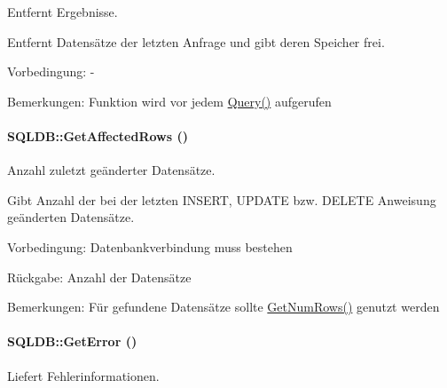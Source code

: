 Entfernt Ergebnisse. 

Entfernt Datensätze der letzten Anfrage und gibt deren Speicher frei. \begin{Desc}
\item[Vorbedingung:]- \end{Desc}
\begin{Desc}
\item[Bemerkungen:]Funktion wird vor jedem \hyperlink{classSQLDB_fc6ffa8df50f68f07d9f5e3385b96d7a}{Query()} aufgerufen \end{Desc}
\hypertarget{classSQLDB_8f3c28ae4ed5941c043459d6204a887b}{
\paragraph[GetAffectedRows]{\setlength{\rightskip}{0pt plus 5cm}SQLDB::Get\-Affected\-Rows ()}\hfill}
\label{classSQLDB_8f3c28ae4ed5941c043459d6204a887b}


Anzahl zuletzt geänderter Datensätze. 

Gibt Anzahl der bei der letzten INSERT, UPDATE bzw. DELETE Anweisung geänderten Datensätze. \begin{Desc}
\item[Vorbedingung:]Datenbankverbindung muss bestehen \end{Desc}
\begin{Desc}
\item[R\"{u}ckgabe:]Anzahl der Datensätze \end{Desc}
\begin{Desc}
\item[Bemerkungen:]Für gefundene Datensätze sollte \hyperlink{classSQLDB_15b181251b309ab55331be29fa33ac9f}{Get\-Num\-Rows()} genutzt werden \end{Desc}
\hypertarget{classSQLDB_efc9afe11649d6cdae21575717ec3436}{
\paragraph[GetError]{\setlength{\rightskip}{0pt plus 5cm}SQLDB::Get\-Error ()}\hfill}
\label{classSQLDB_efc9afe11649d6cdae21575717ec3436}


Liefert Fehlerinformationen. 

